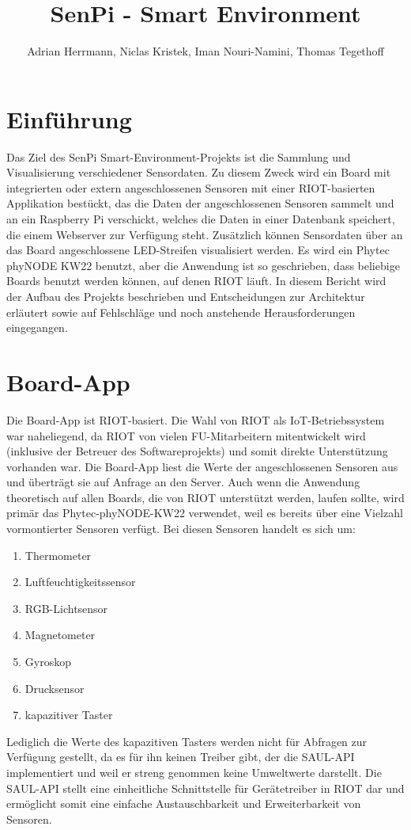 \documentclass[a4paper]{article}
\title{SenPi - Smart Environment}
\author{Adrian Herrmann, Niclas Kristek, Iman Nouri-Namini, Thomas Tegethoff}
\begin{document}
\maketitle

\section{Einführung}

Das Ziel des SenPi Smart-Environment-Projekts ist die Sammlung und Visualisierung verschiedener Sensordaten. Zu diesem Zweck wird ein Board mit integrierten oder extern angeschlossenen Sensoren mit einer RIOT-basierten Applikation bestückt, das die Daten der angeschlossenen Sensoren sammelt und an ein Raspberry Pi verschickt, welches die Daten in einer Datenbank speichert, die einem Webserver zur Verfügung steht. Zusätzlich können Sensordaten über an das Board angeschlossene LED-Streifen visualisiert werden. Es wird ein Phytec phyNODE KW22 benutzt, aber die Anwendung ist so geschrieben, dass beliebige Boards benutzt werden können, auf denen RIOT läuft. In diesem Bericht wird der Aufbau des Projekts beschrieben und Entscheidungen zur Architektur erläutert sowie auf Fehlschläge und noch anstehende Herausforderungen eingegangen.

\section{Board-App}
Die Board-App ist RIOT-basiert. Die Wahl von RIOT als IoT-Betriebssystem war naheliegend, da RIOT von vielen FU-Mitarbeitern mitentwickelt wird (inklusive der Betreuer des Softwareprojekts) und somit direkte Unterstützung 
vorhanden war. Die Board-App liest die Werte der angeschlossenen Sensoren aus und überträgt sie auf Anfrage an den Server. Auch wenn die Anwendung theoretisch auf allen Boards, die von RIOT unterstützt werden, laufen sollte, wird primär das Phytec-phyNODE-KW22 verwendet, weil es bereits über eine Vielzahl vormontierter Sensoren verfügt. Bei diesen Sensoren handelt es sich um:
\begin{enumerate}
	\item Thermometer
    \item Luftfeuchtigkeitssensor
    \item RGB-Lichtsensor
    \item Magnetometer
    \item Gyroskop
    \item Drucksensor
    \item kapazitiver Taster
\end{enumerate}
Lediglich die Werte des kapazitiven Tasters werden nicht für Abfragen zur Verfügung gestellt, da es für ihn keinen Treiber gibt, der die SAUL-API implementiert und weil er streng genommen keine Umweltwerte darstellt. Die SAUL-API stellt eine einheitliche Schnittstelle für Gerätetreiber in RIOT dar und ermöglicht somit eine einfache Austauschbarkeit und Erweiterbarkeit von Sensoren.
\end{document}
